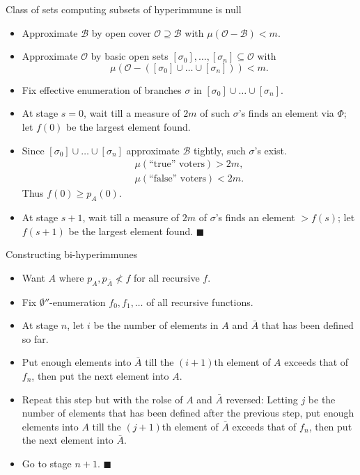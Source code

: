 \begin{frame}{Class of sets computing subsets of hyperimmune is null}
  \begin{itemize}
    \item Approximate $\mathcal{B}$ by open cover
      $\mathcal{O}\supseteq\mathcal{B}$ with
      $\mu(\mathcal{O}-\mathcal{B})<m$.
    \item Approximate $\mathcal{O}$ by basic open sets
      $[\sigma_0],\ldots,[\sigma_n] \subseteq\mathcal{O}$ with
      \[\mu(\mathcal{O}-([\sigma_0]\cup\ldots\cup[\sigma_n])) <m.\]
    \item Fix effective enumeration of branches $\sigma$ in
      $[\sigma_0]\cup\ldots\cup[\sigma_n]$.
    \item At stage $s=0$, wait till a measure of $2m$ of such $\sigma$'s
      finds an element via $\Phi$; let $f(0)$ be the largest element found.
    \item Since $[\sigma_0]\cup\ldots\cup[\sigma_n]$ approximate
      $\mathcal{B}$ tightly, such $\sigma$'s exist.
      \begin{align*}
        \mu(\text{``true'' voters})>2m,\\
        \mu(\text{``false'' voters})<2m.
      \end{align*}
      Thus $f(0)\geq p_A(0)$.
    \item At stage $s+1$, wait till a measure of $2m$ of $\sigma$'s
      finds an element $>f(s)$; let $f(s+1)$ be the largest
      element found. $\blacksquare$
  \end{itemize}
\end{frame}

\begin{frame}{Constructing bi-hyperimmunes}
  \begin{itemize}
    \item Want $A$ where $p_A,p_{\bar{A}}\not<f$ for all recursive $f$.
    \item Fix $\emptyset''$-enumeration $f_0,f_1,\ldots$ of all recursive
      functions.
    \item At stage $n$, let $i$ be the number of elements in $A$ and
      $\bar{A}$ that has been defined so far.
    \item Put enough elements into $\bar{A}$ till the $(i+1)$th element
      of $A$ exceeds that of $f_n$, then put the next element into $A$.
    \item Repeat this step but with the rolse of $A$ and $\bar{A}$
      reversed: Letting $j$ be the number of elements that has been defined
      after the previous step, put enough elements into $A$ till the
      $(j+1)$th element of $\bar{A}$ exceeds that of $f_n$, then put the
      next element into $\bar{A}$.
    \item Go to stage $n+1$. $\blacksquare$
  \end{itemize}
\end{frame}
